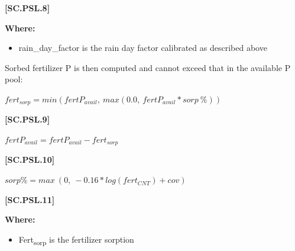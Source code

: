             {\raggedleft \textbf{[SC.PSL.8]}\par}
            \vspace{0.5cm}

        \textbf{Where:}
            
        \begin{itemize}
            \item rain\_day\_factor is the rain day factor calibrated as described above
        \end{itemize}
        \vspace{0.2cm}


Sorbed fertilizer P is then computed and cannot exceed that in the available P pool:
        \vspace{0.5cm}
        
    \begin{center}
\(fert_{sorp}=min(fertP_{avail},\ max(0.0,\ fertP_{avail} * sorp\ \%))\)
    \end{center}
        \vspace{0.5cm} 
    
            {\raggedleft \textbf{[SC.PSL.9]}\par}
            \vspace{0.5cm}

    \begin{center}
\(fertP_{avail}=fertP_{avail}-fert_{sorp}\)
    \end{center}
        \vspace{0.5cm} 
    
            {\raggedleft \textbf{[SC.PSL.10]}\par}
            \vspace{0.5cm}

    \begin{center}
\(sorp\%= max\ (0,\ -0.16 * log(fert_{CNT})+cov)\)

    \end{center}
        \vspace{0.5cm} 
    
            {\raggedleft \textbf{[SC.PSL.11]}\par}
            \vspace{0.5cm}

        \textbf{Where:}
            
        \begin{itemize}
            \item Fert\textsubscript{sorp} is the fertilizer sorption
        \end{itemize}
        \vspace{0.2cm}

